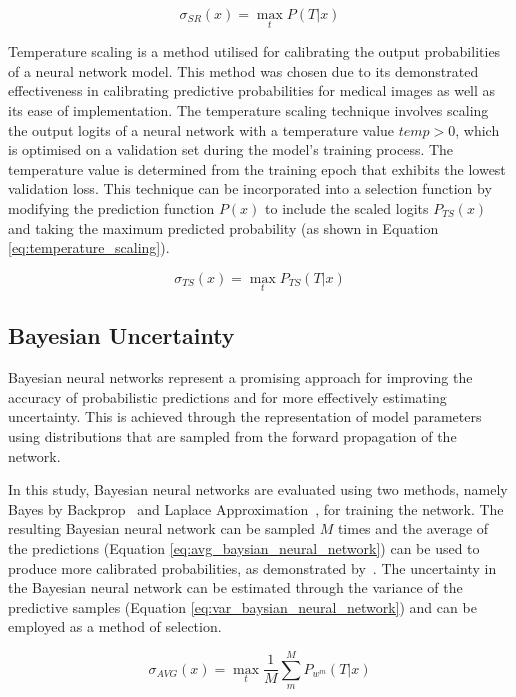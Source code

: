 \begin{equation}
	\sigma_{SR}(x) = \max_{t} P(T|x)
	\label{eq:softmax_response}
\end{equation}

Temperature scaling is a method utilised for calibrating the output probabilities of a neural network model. This method was chosen due to its demonstrated effectiveness in calibrating predictive probabilities for medical images as well as its ease of implementation. The temperature scaling technique involves scaling the output logits of a neural network with a temperature value $temp > 0$, which is optimised on a validation set during the model's training process. The temperature value is determined from the training epoch that exhibits the lowest validation loss. This technique can be incorporated into a selection function by modifying the prediction function $P(x)$ to include the scaled logits $P_{TS}(x)$ and taking the maximum predicted probability (as shown in Equation \ref{eq:temperature_scaling}).

\begin{equation}
	\sigma_{TS}(x) = \max_t P_{TS}(T|x)
	\label{eq:selective_temperature_scaling}
\end{equation}

\subsection{Bayesian Uncertainty}
\label{subsec:selective_uncertainity}
Bayesian neural networks represent a promising approach for improving the accuracy of probabilistic predictions and for more effectively estimating uncertainty. This is achieved through the representation of model parameters using distributions that are sampled from the forward propagation of the network.

In this study, Bayesian neural networks are evaluated using two methods, namely Bayes by Backprop~\citep{blundell2015weight} and Laplace Approximation~\citep{mackay1992bayesian}, for training the network. The resulting Bayesian neural network can be sampled $M$ times and the average of the predictions (Equation \ref{eq:avg_baysian_neural_network}) can be used to produce more calibrated probabilities, as demonstrated by~\citep{jospin2020hands}. The uncertainty in the Bayesian neural network can be estimated through the variance of the predictive samples (Equation \ref{eq:var_baysian_neural_network}) and can be employed as a method of selection.

\begin{equation}
	\sigma_{AVG}(x) = \max_t \frac{1}{M} \sum_m^M P_{w^m}(T|x)
	\label{eq:avg_baysian_neural_network}
\end{equation}


